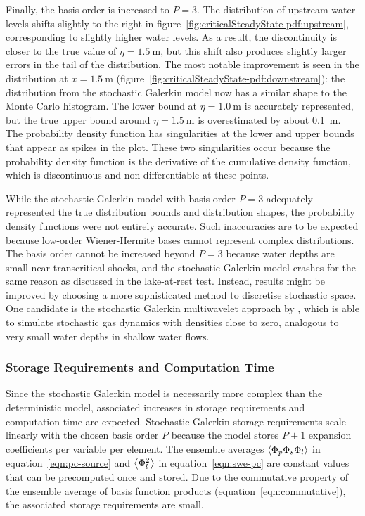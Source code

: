Finally, the basis order is increased to $P=3$.
The distribution of upstream water levels shifts slightly to the right in figure~\ref{fig:criticalSteadyState-pdf:upstream}, corresponding to slightly higher water levels.
As a result, the discontinuity is closer to the true value of $\eta = \SI{1.5}{\meter}$, but this shift also produces slightly larger errors in the tail of the distribution.
The most notable improvement is seen in the distribution at $x = \SI{1.5}{\meter}$ (figure~\ref{fig:criticalSteadyState-pdf:downstream}):
the distribution from the stochastic Galerkin model now has a similar shape to the Monte Carlo histogram.
The lower bound at $\eta = \SI{1.0}{\meter}$ is accurately represented, but the true upper bound around $\eta = \SI{1.5}{\meter}$ is overestimated by about \SI{0.1}{\meter}.
The probability density function has singularities at the lower and upper bounds that appear as spikes in the plot.
These two singularities occur because the probability density function is the derivative of the cumulative density function, which is discontinuous and non-differentiable at these points.

While the stochastic Galerkin model with basis order $P=3$ adequately represented the true distribution bounds and distribution shapes, the probability density functions were not entirely accurate.
Such inaccuracies are to be expected because low-order Wiener-Hermite bases cannot represent complex distributions.
The basis order cannot be increased beyond $P=3$ because water depths are small near transcritical shocks, and the stochastic Galerkin model crashes for the same reason as discussed in the lake-at-rest test.
Instead, results might be improved by choosing a more sophisticated method to discretise stochastic space.
One candidate is the stochastic Galerkin multiwavelet approach by \citet{pettersson2014}, which is able to simulate stochastic gas dynamics with densities close to zero,  analogous to very small water depths in shallow water flows.

\subsubsection{Storage Requirements and Computation Time}

Since the stochastic Galerkin model is necessarily more complex than the deterministic model, associated increases in storage requirements and computation time are expected.
Stochastic Galerkin storage requirements scale linearly with the chosen basis order $P$ because the model stores $P+1$ expansion coefficients per variable per element.
The ensemble averages $\left\langle \Phi_p \Phi_s \Phi_l \right\rangle$ in equation~\eqref{eqn:pc-source} and $\left\langle \Phi_l^2 \right\rangle$ in equation~\eqref{eqn:swe-pc} are constant values that can be precomputed once and stored.
Due to the commutative property of the ensemble average of basis function products (equation~\ref{eqn:commutative}), the associated storage requirements are small.

